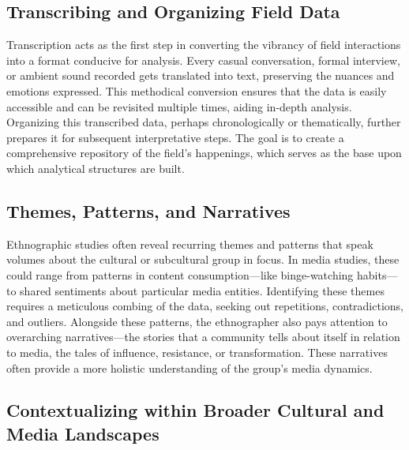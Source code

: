 \documentclass[
  b5paper]{book}
\begin{document}
\hypertarget{transcribing-and-organizing-field-data}{%
\subsection*{Transcribing and Organizing Field Data}\label{transcribing-and-organizing-field-data}}

Transcription acts as the first step in converting the vibrancy of field interactions into a format conducive for analysis. Every casual conversation, formal interview, or ambient sound recorded gets translated into text, preserving the nuances and emotions expressed. This methodical conversion ensures that the data is easily accessible and can be revisited multiple times, aiding in-depth analysis. Organizing this transcribed data, perhaps chronologically or thematically, further prepares it for subsequent interpretative steps. The goal is to create a comprehensive repository of the field's happenings, which serves as the base upon which analytical structures are built.

\hypertarget{themes-patterns-and-narratives}{%
\subsection*{Themes, Patterns, and Narratives}\label{themes-patterns-and-narratives}}

Ethnographic studies often reveal recurring themes and patterns that speak volumes about the cultural or subcultural group in focus. In media studies, these could range from patterns in content consumption---like binge-watching habits---to shared sentiments about particular media entities. Identifying these themes requires a meticulous combing of the data, seeking out repetitions, contradictions, and outliers. Alongside these patterns, the ethnographer also pays attention to overarching narratives---the stories that a community tells about itself in relation to media, the tales of influence, resistance, or transformation. These narratives often provide a more holistic understanding of the group's media dynamics.

\hypertarget{contextualizing-within-broader-cultural-and-media-landscapes}{%
\subsection*{Contextualizing within Broader Cultural and Media Landscapes}\label{contextualizing-within-broader-cultural-and-media-landscapes}}
\end{document}
